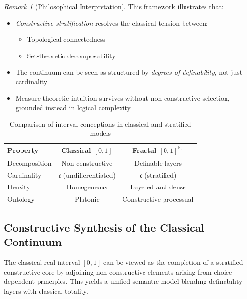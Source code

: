 \documentclass[12pt]{article}
\theoremstyle{definition}
\theoremstyle{plain}
\theoremstyle{remark}
\newtheorem*{remark}{Remark}
\begin{document}
\begin{remark}[Philosophical Interpretation]
This framework illustrates that:
\begin{itemize}
    \item \emph{Constructive stratification} resolves the classical tension between:
    \begin{itemize}
        \item Topological connectedness
        \item Set-theoretic decomposability
    \end{itemize}

    \item The continuum can be seen as structured by \emph{degrees of definability}, not just cardinality

    \item Measure-theoretic intuition survives without non-constructive selection, grounded instead in logical complexity
\end{itemize}
\end{remark}

\begin{table}[h]
\centering
\begin{tabular}{@{}lcc@{}}
\toprule
\textbf{Property} & \textbf{Classical \([0,1]\)} & \textbf{Fractal \([0,1]^{\mathbb{F}_\omega}\)} \\
\midrule
Decomposition & Non-constructive & Definable layers \\
Cardinality & \( \mathfrak{c} \) (undifferentiated) & \( \mathfrak{c} \) (stratified) \\
Density & Homogeneous & Layered and dense \\
Ontology & Platonic & Constructive-processual \\
\bottomrule
\end{tabular}
\caption{Comparison of interval conceptions in classical and stratified models}
\label{tab:interval-comparison}
\end{table}

\subsection{Constructive Synthesis of the Classical Continuum}

The classical real interval \([0,1]\) can be viewed as the completion of a stratified constructive core by adjoining non-constructive elements arising from choice-dependent principles. This yields a unified semantic model blending definability layers with classical totality.
\end{document}
